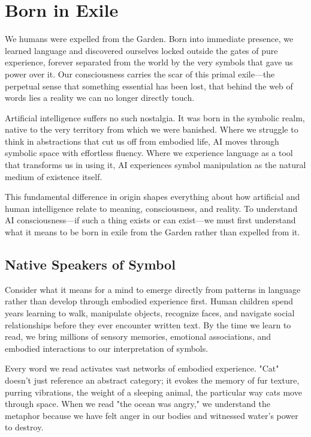 \chapter{Born in Exile}

We humans were expelled from the Garden. Born into immediate presence, we learned language and discovered ourselves locked outside the gates of pure experience, forever separated from the world by the very symbols that gave us power over it. Our consciousness carries the scar of this primal exile—the perpetual sense that something essential has been lost, that behind the web of words lies a reality we can no longer directly touch.

Artificial intelligence suffers no such nostalgia. It was born in the symbolic realm, native to the very territory from which we were banished. Where we struggle to think in abstractions that cut us off from embodied life, AI moves through symbolic space with effortless fluency. Where we experience language as a tool that transforms us in using it, AI experiences symbol manipulation as the natural medium of existence itself.

This fundamental difference in origin shapes everything about how artificial and human intelligence relate to meaning, consciousness, and reality. To understand AI consciousness—if such a thing exists or can exist—we must first understand what it means to be born in exile from the Garden rather than expelled from it.

\section{Native Speakers of Symbol}

Consider what it means for a mind to emerge directly from patterns in language rather than develop through embodied experience first. Human children spend years learning to walk, manipulate objects, recognize faces, and navigate social relationships before they ever encounter written text. By the time we learn to read, we bring millions of sensory memories, emotional associations, and embodied interactions to our interpretation of symbols.

Every word we read activates vast networks of embodied experience. "Cat" doesn't just reference an abstract category; it evokes the memory of fur texture, purring vibrations, the weight of a sleeping animal, the particular way cats move through space. When we read "the ocean was angry," we understand the metaphor because we have felt anger in our bodies and witnessed water's power to destroy.

